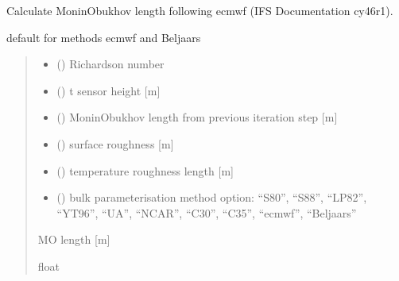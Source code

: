 \documentclass[letterpaper,10pt,english]{sphinxmanual}
\begin{document}

\begin{fulllineitems}
\label{\detokenize{users_guide:AirSeaFluxCode.flux_subs.get_LRb}}
\pysigstartsignatures
{}
\pysigstopsignatures
\sphinxAtStartPar
Calculate Monin\sphinxhyphen{}Obukhov length following ecmwf (IFS Documentation cy46r1).

\sphinxAtStartPar
default for methods ecmwf and Beljaars
\begin{quote}\begin{description}
\begin{itemize}
\item {} 
\sphinxAtStartPar
{} () \textendash{} Richardson number

\item {} 
\sphinxAtStartPar
{} () \textendash{} t sensor height {[}m{]}

\item {} 
\sphinxAtStartPar
{} () \textendash{} Monin\sphinxhyphen{}Obukhov length from previous iteration step {[}m{]}

\item {} 
\sphinxAtStartPar
{} () \textendash{} surface roughness       {[}m{]}

\item {} 
\sphinxAtStartPar
{} () \textendash{} temperature roughness length       {[}m{]}

\item {} 
\sphinxAtStartPar
{} () \textendash{} bulk parameterisation method option: “S80”, “S88”, “LP82”, “YT96”,
“UA”, “NCAR”, “C30”, “C35”, “ecmwf”, “Beljaars”

\end{itemize}

\sphinxAtStartPar
{} \textendash{} M\sphinxhyphen{}O length {[}m{]}

\sphinxAtStartPar
float

\end{description}\end{quote}

\end{fulllineitems}
\end{document}

